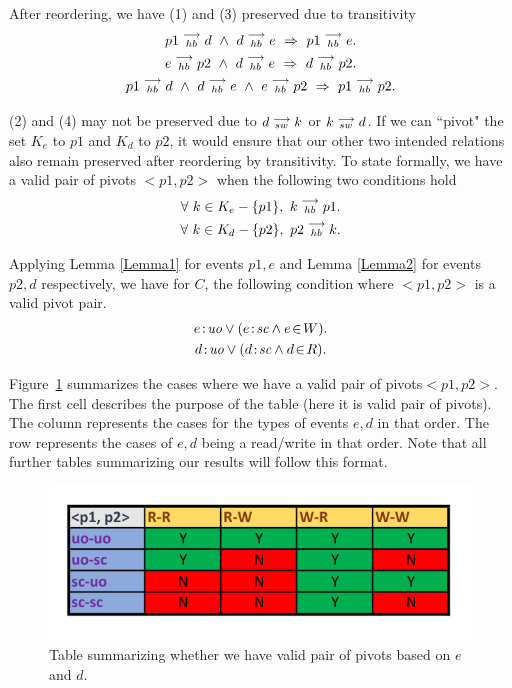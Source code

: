     After reordering, we have (1) and (3) preserved due to transitivity  
    \begin{gather*}
        \reln{p1}{hb}{d} \ \wedge \ \reln{d}{hb}{e} \ \Rightarrow \ \reln{p1}{hb}{e}. \\
        \reln{e}{hb}{p2} \ \wedge \ \reln{d}{hb}{e} \ \Rightarrow \ \reln{d}{hb}{p2}. \\
        \reln{p1}{hb}{d} \ \wedge \ \reln{d}{hb}{e} \ \wedge \ \reln{e}{hb}{p2} \ \Rightarrow \ \reln{p1}{hb}{p2}. 
    \end{gather*}

    (2) and (4) may not be preserved due to $d\stackrel{\longrightarrow}{_{sw}}k$ or $k\stackrel{\longrightarrow}{_{sw}}d$. If we can ``pivot" the  set $K_e$ to $p1$ and $K_d$ to $p2$, it would ensure that our other two intended relations also remain preserved after reordering by transitivity. 
    To state formally, we have a valid pair of pivots $<p1,p2>$ when the following two conditions hold
    \begin{gather*}
        \forall \ k \in K_e - \{p1\}, \ k\stackrel{\longrightarrow}{_{hb}}p1. \\
        \forall \ k \in K_d - \{p2\}, \ p2\stackrel{\longrightarrow}{_{hb}}k.
    \end{gather*}
    
    Applying Lemma \ref{Lemma1} for events $p1,e$ and Lemma \ref{Lemma2} for events $p2,d$ respectively, we have for $C$, the following condition where $<p1, p2>$ is a valid pivot pair.
    \begin{gather*}
        \et{e}{uo} \vee (\et{e}{sc} \wedge \event{e}{W}). \\
        \et{d}{uo} \vee (\et{d}{sc} \wedge \event{d}{R}).
    \end{gather*}
        
    Figure~\ref{reord:preserve_hb_table} summarizes the cases where we have a valid pair of pivots\footnotemark $<p1,p2>$.
    The first cell describes the purpose of the table (here it is valid pair of pivots).
    The column represents the cases for the types of events $e,d$ in that order. 
    The row represents the cases of $e,d$ being a read/write in that order. 
    Note that all further tables summarizing our results will follow this format. 
    \begin{figure}[H]
        \centering
        \includegraphics[scale=0.7]{4.InstructionReordering/4.ValidReorderingCandidate/ProofParts/Part1/part1_table.pdf}
        \caption{Table summarizing whether we have valid pair of pivots based on  $e$ and $d$.}
        \label{reord:preserve_hb_table}
    \end{figure}
            
